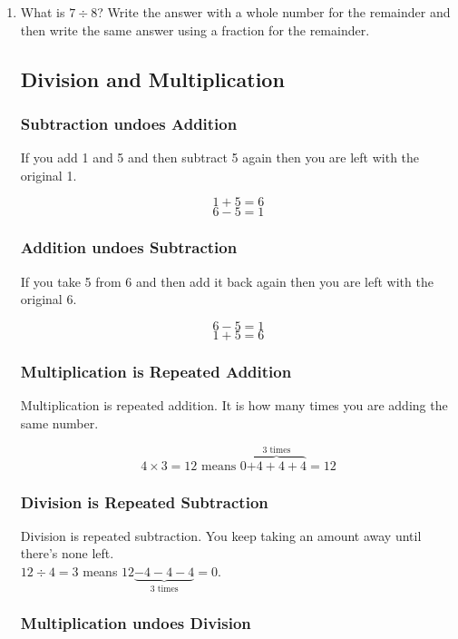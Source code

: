\documentclass{article}
\begin{document}
\begin{enumerate}
\item What is $7 \div 8$? Write the answer with a whole number for the remainder and then write the same answer using  a fraction for the remainder.

\newpage

\subsection*{Division and Multiplication}

\subsubsection{Subtraction undoes Addition}
If you add 1 and 5 and then subtract 5 again then you are left with the original 1.

$$1+5=6$$
$$6-5=1$$

\subsubsection{Addition undoes Subtraction}
If you take 5 from 6 and then add it back again then you are left with the original 6.

$$6-5=1$$
$$1+5=6$$

\subsubsection{Multiplication is Repeated Addition}

Multiplication is repeated addition. It is how many times you are adding the same number.

$$4 \times 3 = 12 \textrm{ means } 0\overbrace{+ 4 + 4 + 4}^{\textrm{3\ times}} = 12$$

\subsubsection{Division is Repeated Subtraction}

Division is repeated subtraction. You keep taking an amount away until there's none left.\\

$12 \div 4 = 3$ means $12 \underbrace{- 4 - 4 - 4}_{\textrm{3\ times}} = 0$.\\

\subsubsection{Multiplication undoes Division}


\end{enumerate}
\end{document}
